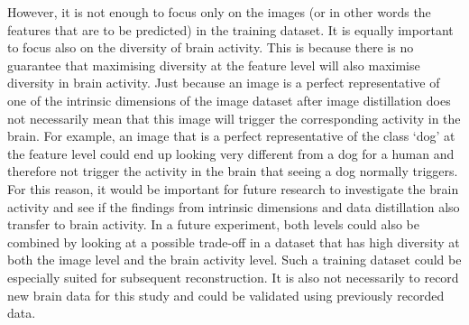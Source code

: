 However, it is not enough to focus only on the images (or in other words the features that are to be predicted) in the training dataset. It is equally important to focus also on the diversity of brain activity. This is because there is no guarantee that maximising diversity at the feature level will also maximise diversity in brain activity. Just because an image is a perfect representative of one of the intrinsic dimensions of the image dataset after image distillation does not necessarily mean that this image will trigger the corresponding activity in the brain. For example, an image that is a perfect representative of the class `dog' at the feature level could end up looking very different from a dog for a human and therefore not trigger the activity in the brain that seeing a dog normally triggers. For this reason, it would be important for future research to investigate the brain activity and see if the findings from intrinsic dimensions and data distillation also transfer to brain activity. In a future experiment, both levels could also be combined by looking at  a possible trade-off in a dataset that has high diversity at both the image level and the brain activity level. Such a training dataset could be especially suited for subsequent reconstruction. It is also not necessarily to record new brain data for this study and could be validated using previously recorded data.

